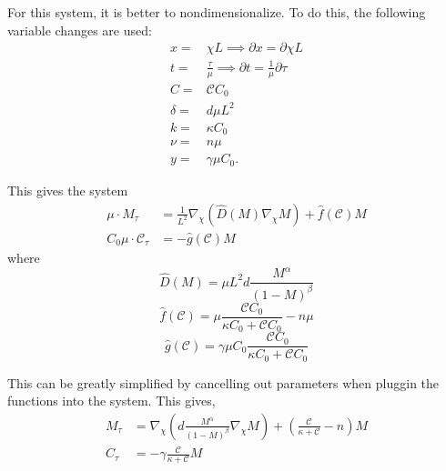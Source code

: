 \documentclass[12pt]{article}
\begin{document}
  For this system, it is better to nondimensionalize. To do this, the following variable changes are used:
  \begin{align}
    x =& \chi L \implies \partial x = \partial \chi L\\
    t =& \frac{\tau}{\mu} \implies \partial t = \frac{1}{\mu} \partial \tau \\
    C =& \mathscr{C} C_0 \\
    \delta =& d \mu L^2 \\
    k =& \kappa C_0 \\
    \nu =& n\mu \\
    y =& \gamma \mu C_0.
  \end{align}

  This gives the system
  \begin{align}
    \mu \cdot M_{\tau} &= \frac{1}{L^2} \nabla_\chi \left(\hat{D}(M) \nabla_\chi M \right) + \hat{f}(\mathscr{C})M \\
    C_0 \mu \cdot \mathscr{C}_{\tau} &= -\hat{g}(\mathscr{C}) M
  \end{align}
  where 
  \begin{equation}
    \hat{D}(M) = {\mu L^2 d} \frac{M^\alpha}{(1-M)^\beta}
  \end{equation}
  \begin{equation}
    \hat{f}(\mathscr{C}) = \mu \frac{\mathscr{C} C_0}{\kappa C_0 + \mathscr{C} C_0} - n \mu
  \end{equation}
  \begin{equation}
    \hat{g}(\mathscr{C}) = \gamma \mu C_0 \frac{\mathscr{C} C_0}{\kappa C_0 + \mathscr{C} C_0} 
  \end{equation}
  
  This can be greatly simplified by cancelling out parameters when pluggin the functions into the system. This gives,
  \begin{align}
    M_\tau &= \nabla_\chi \left( d \frac{M^\alpha}{(1-M)^{\beta}} \nabla_\chi M \right) + \left( \frac{\mathscr{C}}{\kappa+\mathscr{C}} - n \right) M \\
    C_\tau &= -\gamma \frac{\mathscr{C}}{\kappa+\mathscr{C}} M
  \end{align}
  
\end{document}
